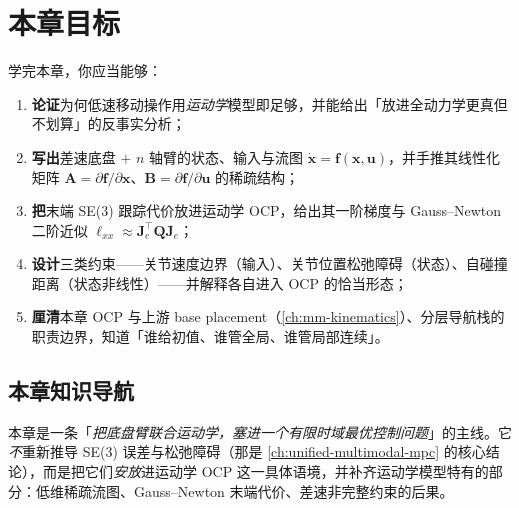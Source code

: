 \section*{本章目标}
学完本章，你应当能够：
\begin{enumerate}
  \item \textbf{论证}为何低速移动操作用\emph{运动学}模型即足够，并能给出「放进全动力学更真但不划算」的反事实分析；
  \item \textbf{写出}差速底盘 $+$ $n$ 轴臂的状态、输入与流图 $\dot{\mathbf x}=\mathbf f(\mathbf x,\mathbf u)$，并手推其线性化矩阵 $\mathbf A=\partial\mathbf f/\partial\mathbf x$、$\mathbf B=\partial\mathbf f/\partial\mathbf u$ 的稀疏结构；
  \item \textbf{把}末端 SE(3) 跟踪代价放进运动学 OCP，给出其一阶梯度与 Gauss--Newton 二阶近似 $\boldsymbol\ell_{xx}\approx\mathbf J_e^\top\mathbf Q\mathbf J_e$；
  \item \textbf{设计}三类约束——关节速度边界（输入）、关节位置松弛障碍（状态）、自碰撞距离（状态非线性）——并解释各自进入 OCP 的恰当形态；
  \item \textbf{厘清}本章 OCP 与上游 base placement（\cref{ch:mm-kinematics}）、分层导航栈的职责边界，知道「谁给初值、谁管全局、谁管局部连续」。
\end{enumerate}

\subsection*{本章知识导航}
本章是一条「\emph{把底盘臂联合运动学，塞进一个有限时域最优控制问题}」的主线。它\emph{不}重新推导 SE(3) 误差与松弛障碍（那是 \cref{ch:unified-multimodal-mpc} 的核心结论），而是把它们\emph{安放}进运动学 OCP 这一具体语境，并补齐运动学模型特有的部分：低维稀疏流图、Gauss--Newton 末端代价、差速非完整约束的后果。

